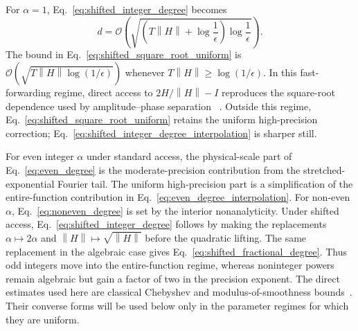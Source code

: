 \documentclass[aps,pra,reprint,floatfix,unsortedaddress,superscriptaddress]{revtex4-2}
\newcommand{\norm}[1]{\left\lVert#1\right\rVert}
\newcommand{\Ocal}{\mathcal{O}}
\begin{document}
For $\alpha=1$, Eq.~\eqref{eq:shifted_integer_degree} becomes
\begin{equation}
    d=\Ocal\!\left(
    \sqrt{
    \left(T\norm{H}+\log\frac{1}{\epsilon}\right)
    \log\frac{1}{\epsilon}}
    \right).
    \label{eq:shifted_square_root_uniform}
\end{equation}
The bound in Eq.~\eqref{eq:shifted_square_root_uniform} is
$\Ocal(\sqrt{T\norm{H}\log(1/\epsilon)})$ whenever
$T\norm{H}\geq\log(1/\epsilon)$.  In this fast-forwarding regime,
direct access to $2H/\norm{H}-I$ reproduces the square-root dependence
used by amplitude--phase separation
~\cite{aggarwal2022optimaldegree,
low2017hamiltoniansimulationuniformspectral,
hu2026quantumsimulationnonunitarydynamics}.  Outside this regime,
Eq.~\eqref{eq:shifted_square_root_uniform} retains the uniform
high-precision correction; Eq.~\eqref{eq:shifted_integer_degree_interpolation}
is sharper still.

For even integer $\alpha$ under standard access, the physical-scale part of
Eq.~\eqref{eq:even_degree} is the moderate-precision contribution from
the stretched-exponential Fourier tail.  The uniform high-precision
part is a simplification of the entire-function contribution in
Eq.~\eqref{eq:even_degree_interpolation}.  For non-even $\alpha$,
Eq.~\eqref{eq:noneven_degree} is set by the interior nonanalyticity.
Under shifted access, Eq.~\eqref{eq:shifted_integer_degree} follows by
making the replacements $\alpha\mapsto2\alpha$ and
$\norm{H}\mapsto\sqrt{\norm{H}}$ before the quadratic lifting.  The
same replacement in the algebraic case gives
Eq.~\eqref{eq:shifted_fractional_degree}.  Thus odd integers move into
the entire-function regime, whereas noninteger powers remain
algebraic but gain a factor of two in the precision exponent.
The direct estimates used here are classical Chebyshev and
modulus-of-smoothness bounds~\cite{devore1993constructive,
ditzian1987moduli,trefethen2019approximation}.  Their converse forms
will be used below only in the parameter regimes for which they are
uniform.
\end{document}
